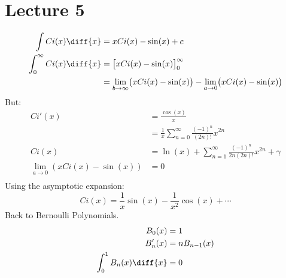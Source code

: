 \documentclass[crop=false,class=book,oneside]{standalone}
\begin{document}
    \section{Lecture 5}
        \begin{align}
            \int{Ci(x)}\diff{x}&=xCi(x)-\sin(x)+c\\
            \int_{0}^{\infty}Ci(x)\diff{x}
            &=\big[xCi(x)-\sin(x)\big]_{0}^{\infty}\\
            &=\underset{b\rightarrow\infty}{\lim}
                \big(xCi(x)-\sin(x)\big)-
                \underset{a\rightarrow{0}}{\lim}
                \big(xCi(x)-\sin(x)\big)
        \end{align}
        But:
        \begin{align}
            Ci'(x)&=\frac{\cos(x)}{x}\\
                &=\frac{1}{x}\sum_{n=0}^{\infty}
                \frac{(-1)^{n}}{(2n)!}x^{2n}\\
            Ci(x)&=\ln(x)+\sum_{n=1}^{\infty}
            \frac{(-1)^{n}}{2n(2n)!}x^{2n}+\gamma\\
            \underset{a\rightarrow{0}}{\lim}(xCi(x)-\sin(x))&=0\\
        \end{align}
        Using the asymptotic expansion:
        \begin{equation}
            Ci(x)=\frac{1}{x}\sin(x)-\frac{1}{x^{2}}\cos(x)+\cdots
        \end{equation}
        Back to Bernoulli Polynomials.
        \begin{align}
            B_{0}(x)&=1\\
            B_{n}'(x)&=nB_{n-1}(x)\\
            \int_{0}^{1}B_{n}(x)\diff{x}&=0
        \end{align}
\end{document}
